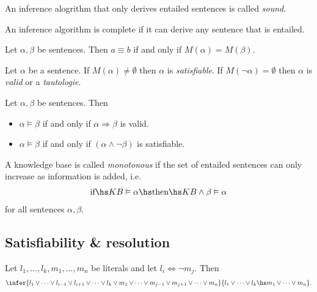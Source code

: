 \documentclass{article}
\begin{document}
\begin{definition}
    An inference alogrithm that only derives entailed sentences is called \emph{sound}.
\end{definition}

\begin{definition}
    An inference algorithm is complete if it can derive any sentence that is entailed.
\end{definition}

\begin{definition}
    Let $\alpha,\beta$ be sentences. Then $a\equiv b$ if and only if $M(\alpha)=M(\beta)$.
\end{definition}

\begin{definition}
    Let $\alpha$ be a sentence. If $M(\alpha)\not=\emptyset$ then $\alpha$ is \emph{satisfiable}.
    If $M(\neg\alpha)=\emptyset$ then $\alpha$ is \emph{valid} or a \emph{tautologie}.
\end{definition}

\begin{lemma}
    Let $\alpha,\beta$ be sentences. Then
    \begin{itemize}
        \item $\alpha\vDash\beta$ if and only if $\alpha\Rightarrow\beta$ is valid.
        \item $\alpha\vDash\beta$ if and only if $(\alpha\wedge\neg\beta)$ is satisfiable.
    \end{itemize}
\end{lemma}

\begin{definition}
    A knowledge base is called \emph{monotonous} if the set of entailed sentences can
    only increase as information is added, i.e.
    \begin{align*}
        \text{if}\hs KB \vDash \alpha \hs\text{then}\hs KB\wedge \beta \vDash \alpha
    \end{align*}
    for all sentences $\alpha,\beta$.
\end{definition}

\subsection{Satisfiability \& resolution}

\begin{theorem}
    Let $l_1,...,l_k,m_1,...,m_n$ be literals and let $l_i\Leftrightarrow\neg m_j$. Then
    \begin{align*}
        \infer{l_1\vee \cdots\vee l_{i-1}\vee l_{i+1}\vee\cdots\vee l_k\vee m_1\vee\cdots\vee m_{j-1}\vee m_{j+1}\vee \cdots\vee m_n}{
            l_1\vee\cdots \vee l_k\hs m_1\vee\cdots\vee m_n
        }.
    \end{align*}
\end{theorem}
\end{document}
